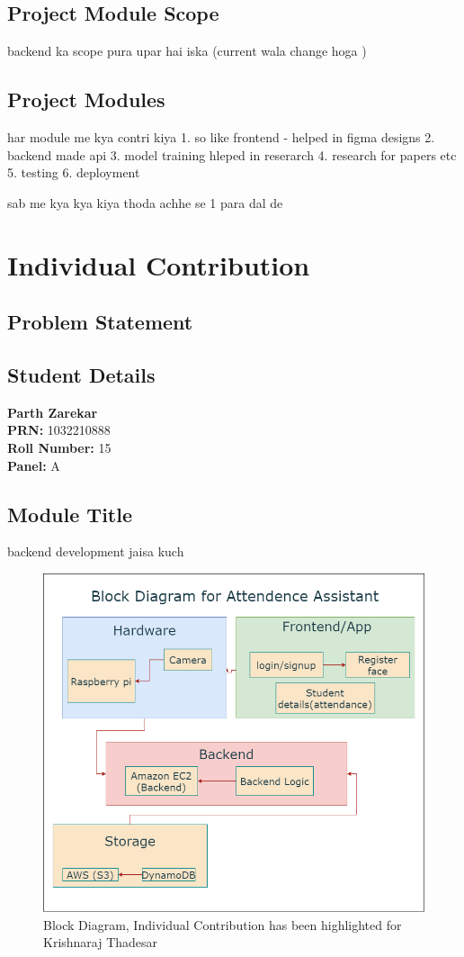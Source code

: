 \documentclass[openany]{report}
\begin{document}
\section{Project Module Scope}
backend ka scope pura upar hai iska (current wala change hoga )
\section{Project Modules}
har module me kya contri kiya
1. so like frontend - helped in figma designs
2. backend made api
3. model training hleped in reserarch
4. research for papers etc
5. testing
6. deployment

sab me kya kya kiya thoda achhe se 1 para dal de

\chapter{Individual Contribution}
\section{Problem Statement}
\section{Student Details}
\textbf{Parth Zarekar} \\
\textbf{PRN:} 1032210888 \\
\textbf{Roll Number:} 15 \\
\textbf{Panel:} A \\
\section{Module Title}
backend development  jaisa kuch
\begin{figure}[H]
    \centering
    \includegraphics[width=.95\textwidth]{../imgs/block diagram.png}
    \caption{Block Diagram, Individual Contribution has been highlighted for Krishnaraj Thadesar}
    \label{fig:block_diagram}
\end{figure}
\end{document}
